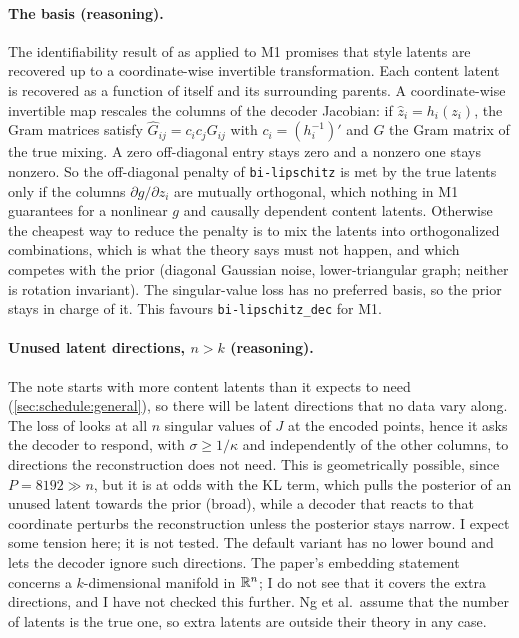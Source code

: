\paragraph{The basis (reasoning).}
The identifiability result of \cite{ng2025} as applied to M1 promises that style latents are 
recovered up to a coordinate-wise invertible transformation. Each content latent is recovered as a 
function of itself and its surrounding parents.
A coordinate-wise invertible map rescales the columns of the
decoder Jacobian: if $\hat z_i=h_i(z_i)$, the Gram matrices satisfy
$\hat G_{ij}=c_i c_j G_{ij}$ with $c_i=(h_i^{-1})'$ and $G$ the Gram matrix of the
true mixing. A zero off-diagonal entry stays zero and a nonzero one stays nonzero.
So the off-diagonal penalty of \texttt{bi-lipschitz} is met by the true latents only
if
the columns $\partial g/\partial z_i$ are mutually orthogonal, which nothing in M1
guarantees for a nonlinear $g$ and causally dependent content latents. Otherwise the
cheapest way to reduce the penalty is to mix the latents into orthogonalized
combinations, which is what the theory says must not happen, and which competes with
the prior (diagonal Gaussian noise, lower-triangular graph; neither is rotation
invariant). The singular-value loss has no preferred basis, so the prior stays in
charge
of it. This favours \texttt{bi-lipschitz\_dec} for M1.

\paragraph{Unused latent directions, $n>k$ (reasoning).}
The note starts with more content latents than it expects to need
(\cref{sec:schedule:general}), so there will be latent directions that no data vary
along. The loss of \cite[Eq.~(12)]{zhan2026blae} looks at all $n$ singular values of 
$J$ at the encoded points, hence it asks the decoder to respond, with $\sigma\ge1/\kappa$ and
independently of the other columns, to directions the reconstruction does not need. This is
geometrically possible, since $P=8192\gg n$, but it is at odds with the KL term,
which pulls the posterior of an unused latent towards the prior (broad), while a decoder
that reacts to that coordinate perturbs the reconstruction unless the posterior stays
narrow. I expect some tension here; it is not tested. The default variant has no
lower bound and lets the decoder ignore such directions. The paper's embedding statement
concerns a $k$-dimensional manifold in $\mathbb{R}^n$; I do not see that it covers the extra
directions, and I have not checked this further. Ng et al.\ assume that the number of
latents is the true one, so extra latents are outside their theory in any case.

